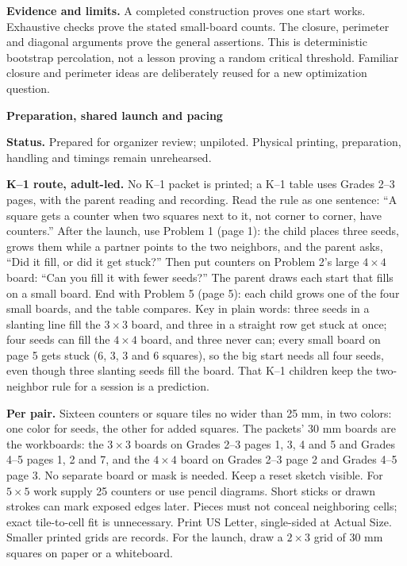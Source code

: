 \documentclass[11pt]{article}
\newcommand{\head}[1]{\par\textbf{\large #1}\par}
\begin{document}
\textbf{Evidence and limits.} A completed construction proves one start works. Exhaustive checks prove the stated small-board counts. The closure, perimeter and diagonal arguments prove the general assertions. This is deterministic bootstrap percolation, not a lesson proving a random critical threshold. Familiar closure and perimeter ideas are deliberately reused for a new optimization question.
\newpage
\head{Preparation, shared launch and pacing}
\textbf{Status.} Prepared for organizer review; unpiloted. Physical printing, preparation, handling and timings remain unrehearsed.

\textbf{K--1 route, adult-led.} No K--1 packet is printed; a K--1 table uses Grades 2--3 pages, with the parent reading and recording. Read the rule as one sentence: ``A square gets a counter when two squares next to it, not corner to corner, have counters.'' After the launch, use Problem 1 (page 1): the child places three seeds, grows them while a partner points to the two neighbors, and the parent asks, ``Did it fill, or did it get stuck?'' Then put counters on Problem 2's large $4\times4$ board: ``Can you fill it with fewer seeds?'' The parent draws each start that fills on a small board. End with Problem 5 (page 5): each child grows one of the four small boards, and the table compares. Key in plain words: three seeds in a slanting line fill the $3\times3$ board, and three in a straight row get stuck at once; four seeds can fill the $4\times4$ board, and three never can; every small board on page 5 gets stuck (6, 3, 3 and 6 squares), so the big start needs all four seeds, even though three slanting seeds fill the board. That K--1 children keep the two-neighbor rule for a session is a prediction.

\textbf{Per pair.} Sixteen counters or square tiles no wider than 25 mm, in two colors: one color for seeds, the other for added squares. The packets' 30 mm boards are the workboards: the $3\times3$ boards on Grades 2--3 pages 1, 3, 4 and 5 and Grades 4--5 pages 1, 2 and 7, and the $4\times4$ board on Grades 2--3 page 2 and Grades 4--5 page 3. No separate board or mask is needed. Keep a reset sketch visible. For $5\times5$ work supply 25 counters or use pencil diagrams. Short sticks or drawn strokes can mark exposed edges later. Pieces must not conceal neighboring cells; exact tile-to-cell fit is unnecessary. Print US Letter, single-sided at Actual Size. Smaller printed grids are records. For the launch, draw a $2\times3$ grid of 30 mm squares on paper or a whiteboard.
\end{document}
